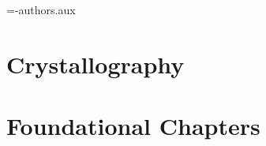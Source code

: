 \documentclass[11pt,fleqn,A4paper]{book}
\begin{document}


\immediate\openout\authorfile=\jobname-authors.aux%


\part{Crystallography}




\part{Foundational Chapters}
%


\end{document}
